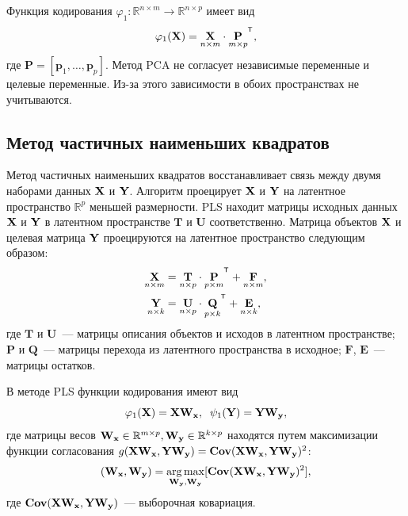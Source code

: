 Функция кодирования $\varphi_1: \mathbb{R}^{n \times m} \to \mathbb{R}^{n \times p}$ имеет вид
\begin{equation}
	\varphi_1(\bX) =  \underset{n \times m}\bX \cdot \underset{m \times p}\bP^{\T},
	\label{eq:PCA2}
\end{equation}
где $\textbf{P} = [\textbf{p}_1, \dots, \textbf{p}_{p}].$
Метод PCA не согласует независимые переменные и целевые переменные. Из-за этого зависимости в обоих пространствах не учитываются.


\subsection{Метод частичных наименьших квадратов}

Метод частичных наименьших квадратов восстанавливает связь между двумя наборами данных $\mathbf{X}$ и $\mathbf{Y}$. Алгоритм проецирует $\mathbf{X}$ и $\mathbf{Y}$ на латентное пространство $\mathbb{R}^{p}$ меньшей размерности. PLS находит матрицы исходных данных $\mathbf{X}$ и $\mathbf{Y}$ в латентном пространстве $\textbf{T}$ и $\textbf{U}$ соответственно. Матрица объектов $\mathbf{X}$ и целевая матрица $\mathbf{Y}$ проецируются на латентное пространство следующим образом:
\begin{align}
	\underset{n \times m}{\bX}  &= \underset{n \times p}{\textbf{T}} \cdot \underset{p \times m}{\textbf{P}}^{\T} +  \underset{n \times m}{\textbf{F}},
	\label{eq:PLSpr1} \\
	\underset{n \times k}{\bY}  &= \underset{n \times p}{\textbf{U}} \cdot \underset{p \times k}{\bQ}^{\T} + \underset{n \times k}{\textbf{E}},
	\label{eq:PLSpr2}
\end{align}
где $\textbf{T}$ и $\textbf{U}$~--- матрицы описания объектов и исходов в латентном пространстве; $\textbf{P}$ и $\textbf{Q}$~--- матрицы перехода из латентного пространства в исходное; $\textbf{F}$, $\textbf{E}$~--- матрицы остатков.

В методе PLS  функции кодирования имеют вид
\begin{equation*}
	\varphi_1(\mathbf{X}) = \mathbf{X} \mathbf{W}_{\mathbf{x}}, \;\;
	\psi_1(\mathbf{Y}) = \mathbf{Y} \mathbf{W}_{\mathbf{y}},
\end{equation*}
где матрицы весов $\mathbf{W}_{\mathbf{x}} \in \mathbb{R}^{m \times p}, \mathbf{W}_{\mathbf{y}} \in \mathbb{R}^{k \times p}$ находятся путем максимизации функции согласования $g(\mathbf{X} \mathbf{W}_{\mathbf{x}},  \mathbf{Y} \mathbf{W}_{\mathbf{y}}) = \textbf{Cov} (\mathbf{X} \mathbf{W}_{\mathbf{x}},  \mathbf{Y} \mathbf{W}_{\mathbf{y}})^{2}$:
\begin{equation}
	(\mathbf{W}_{\mathbf{x}}, \mathbf{W}_{\mathbf{y}}) = \mathop{\arg \max}\limits_{\mathbf{W}_{\mathbf{y}}, \mathbf{W}_{\mathbf{y}}}[ \textbf{Cov}(\mathbf{X} \mathbf{W}_{\mathbf{x}}, \mathbf{Y} \mathbf{W}_{\mathbf{y}})^{2}],
\label{eq:PLSpr3}
\end{equation}
где $\textbf{Cov}(\mathbf{X} \mathbf{W}_{\mathbf{x}}, \mathbf{Y} \mathbf{W}_{\mathbf{y}})$~--- выборочная ковариация.

